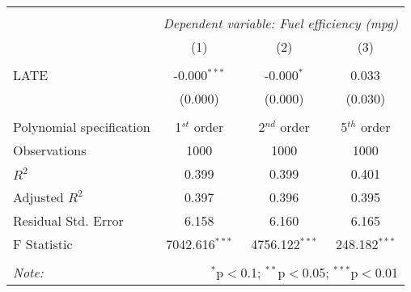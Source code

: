 \begin{tabular}{@{\extracolsep{5pt}}lccc}
\\[-1.8ex]\hline
\hline \\[-1.8ex]
& \multicolumn{3}{c}{\textit{Dependent variable: Fuel efficiency (mpg)}} \
\cr \cline{2-4}
\\[-1.8ex] & (1) & (2) & (3) \\
\hline \\[-1.8ex]
 LATE & -0.000$^{***}$ & -0.000$^{*}$ & 0.033$^{}$ \\
& (0.000) & (0.000) & (0.030) \\
\hline \\[-1.8ex]
 Polynomial specification & 1$^{st}$ order & 2$^{nd}$ order & 5$^{th}$ order \\
 Observations & 1000 & 1000 & 1000 \\
 $R^2$ & 0.399 & 0.399 & 0.401 \\
 Adjusted $R^2$ & 0.397 & 0.396 & 0.395 \\
 Residual Std. Error & 6.158 & 6.160 & 6.165 \\
 F Statistic & 7042.616$^{***}$ & 4756.122$^{***}$ & 248.182$^{***}$ \\
\hline
\hline \\[-1.8ex]
\textit{Note:} & \multicolumn{3}{r}{$^{*}$p$<$0.1; $^{**}$p$<$0.05; $^{***}$p$<$0.01} \\
\end{tabular}